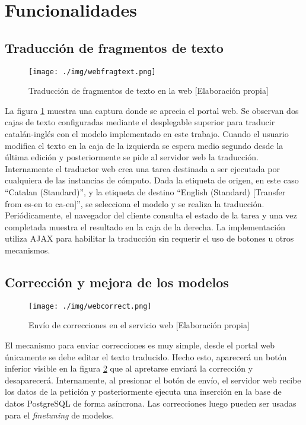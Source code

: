 \section{Funcionalidades}
\subsection{Traducción de fragmentos de texto}
\begin{figure}[H]
    \centering
    \texttt{[image: ./img/webfragtext.png]}
    \caption{Traducción de fragmentos de texto en la web [Elaboración propia]}\label{webfrag}
\end{figure}

La figura \ref{webfrag} muestra una captura donde se aprecia el portal web. Se observan dos cajas de texto configuradas mediante el desplegable superior para traducir catalán-inglés con el modelo implementado en este trabajo.
Cuando el usuario modifica el texto en la caja de la izquierda se espera medio segundo desde la última edición y posteriormente se pide al servidor web la traducción. Internamente el traductor web crea una tarea destinada a ser ejecutada por cualquiera de las instancias de cómputo. Dada la etiqueta de origen, en este caso ``Catalan (Standard)'', y la etiqueta de destino ``English (Standard) [Transfer from es-en to ca-en]'', se selecciona el modelo y se realiza la traducción.
Periódicamente, el navegador del cliente consulta el estado de la tarea y una vez completada muestra el resultado en la caja de la derecha. La implementación utiliza AJAX para habilitar la traducción sin requerir el uso de botones u otros mecanismos.

\subsection{Corrección y mejora de los modelos}
\begin{figure}[H]
    \centering
    \texttt{[image: ./img/webcorrect.png]}
    \caption{Envío de correcciones en el servicio web [Elaboración propia]}\label{webcorrect}
\end{figure}
El mecanismo para enviar correcciones es muy simple, desde el portal web únicamente se debe editar el texto traducido. Hecho esto, aparecerá un botón inferior visible en la figura \ref{webcorrect} que al apretarse enviará la corrección y desaparecerá.
Internamente, al presionar el botón de envío, el servidor web recibe los datos de la petición y posteriormente ejecuta una inserción en la base de datos PostgreSQL de forma asíncrona.
Las correcciones luego pueden ser usadas para el \textit{finetuning} de modelos.

